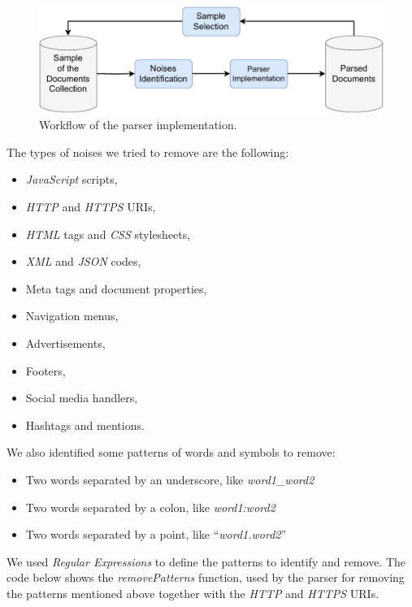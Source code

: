 \begin{figure}[!h]
    \centering
    \includegraphics[width=0.8\linewidth]{figure/Parser_implementation_workflow.pdf}
    \caption{Workflow of the parser implementation.}
    \label{fig:Parser_implementation_workflow}
\end{figure}

\newpage
The types of noises we tried to remove are the following:
\begin{itemize}
\item \textit{JavaScript} scripts,
\item \textit{HTTP} and \textit{HTTPS} URIs,
\item \textit{HTML} tags and \textit{CSS} stylesheets,
\item \textit{XML} and \textit{JSON} codes,
\item Meta tags and document properties,
\item Navigation menus,
\item Advertisements,
\item Footers,
\item Social media handlers,
\item Hashtags and mentions.
\end{itemize}
We also identified some patterns of words and symbols to remove:
\begin{itemize}
\item Two words separated by an underscore, like \textit{word1\_word2}
\item Two words separated by a colon, like \textit{word1:word2}
\item Two words separated by a point, like ``\textit{word1.word2}''
\end{itemize}
We used \textit{Regular Expressions} \cite{regexdefinition} to define the patterns to identify and remove. 
The code below shows the \textit{removePatterns} function, used by the parser for removing the patterns mentioned above together with the \textit{HTTP} and \textit{HTTPS} URIs.
